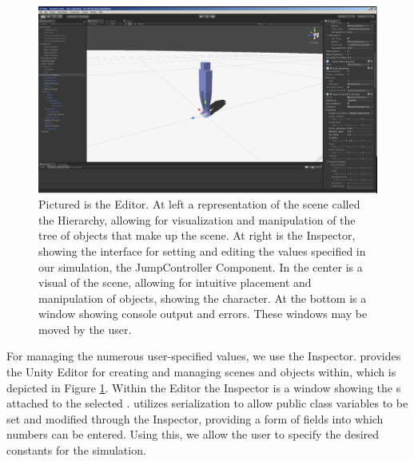 	\begin{figure}[ht]
		\centering
		\includegraphics[width=\textwidth]{images/unityEditor.png}
		\caption[Screenshot of the \unity{} Editor]{Pictured is the \unity{} Editor.  At left a representation of the scene called the Hierarchy, allowing for visualization and manipulation of the tree of objects that make up the scene.  At right is the Inspector, showing the interface for setting and editing the values specified in our simulation, the JumpController Component.  In the center is a visual of the scene, allowing for intuitive placement and manipulation of objects, showing the character.  At the bottom is a window showing console output and errors.  These windows may be moved by the user.}
		\label{fig:unity_interface}
	\end{figure}	
	
	For managing the numerous user-specified values, we use the \unity{} Inspector.  \unity{} provides the Unity Editor for creating and managing scenes and objects within, which is depicted in Figure \ref{fig:unity_interface}.  Within the Editor the Inspector is a window showing the s attached to the selected .  \unity{} utilizes serialization to allow public class variables to be set and modified through the Inspector, providing a form of fields into which numbers can be entered.  Using this, we allow the user to specify the desired constants for the simulation.